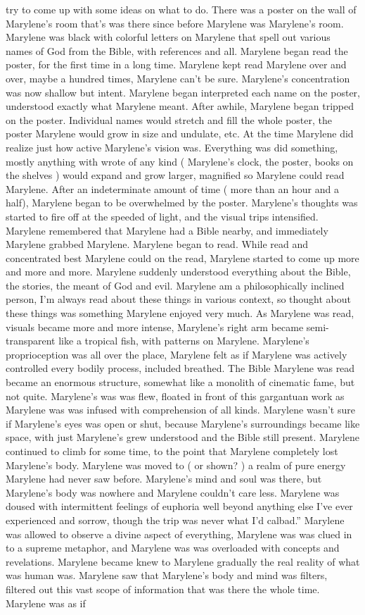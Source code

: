 \documentclass[12pt]{book}
\begin{document}
try to come up with some ideas on what to do. There was a poster on the wall of Marylene's room that's was there since before Marylene was Marylene's room. Marylene was black with colorful letters on Marylene that spell out various names of God from the Bible, with references and all. Marylene began read the poster, for the first time in a long time. Marylene kept read Marylene over and over, maybe a hundred times, Marylene can't be sure. Marylene's concentration was now shallow but intent. Marylene began interpreted each name on the poster, understood exactly what Marylene meant. After awhile, Marylene began tripped on the poster. Individual names would stretch and fill the whole poster, the poster Marylene would grow in size and undulate, etc. At the time Marylene did realize just how active Marylene's vision was. Everything was did something, mostly anything with wrote of any kind ( Marylene's clock, the poster, books on the shelves ) would expand and grow larger, magnified so Marylene could read Marylene. After an indeterminate amount of time ( more than an hour and a half), Marylene began to be overwhelmed by the poster. Marylene's thoughts was started to fire off at the speeded of light, and the visual trips intensified. Marylene remembered that Marylene had a Bible nearby, and immediately Marylene grabbed Marylene. Marylene began to read. While read and concentrated best Marylene could on the read, Marylene started to come up more and more and more. Marylene suddenly understood everything about the Bible, the stories, the meant of God and evil. Marylene am a philosophically inclined person, I'm always read about these things in various context, so thought about these things was something Marylene enjoyed very much. As Marylene was read, visuals became more and more intense, Marylene's right arm became semi-transparent like a tropical fish, with patterns on Marylene. Marylene's proprioception was all over the place, Marylene felt as if Marylene was actively controlled every bodily process, included breathed. The Bible Marylene was read became an enormous structure, somewhat like a monolith of cinematic fame, but not quite. Marylene's was was flew, floated in front of this gargantuan work as Marylene was was infused with comprehension of all kinds. Marylene wasn't sure if Marylene's eyes was open or shut, because Marylene's surroundings became like space, with just Marylene's grew understood and the Bible still present. Marylene continued to climb for some time, to the point that Marylene completely lost Marylene's body. Marylene was moved to ( or shown? ) a realm of pure energy Marylene had never saw before. Marylene's mind and soul was there, but Marylene's body was nowhere and Marylene couldn't care less. Marylene was doused with intermittent feelings of euphoria well beyond anything else I've ever experienced and sorrow, though the trip was never what I'd calbad.'' Marylene was allowed to observe a divine aspect of everything, Marylene was was clued in to a supreme metaphor, and Marylene was was overloaded with concepts and revelations. Marylene became knew to Marylene gradually the real reality of what was human was. Marylene saw that Marylene's body and mind was filters, filtered out this vast scope of information that was there the whole time. Marylene was as if 
\end{document}
